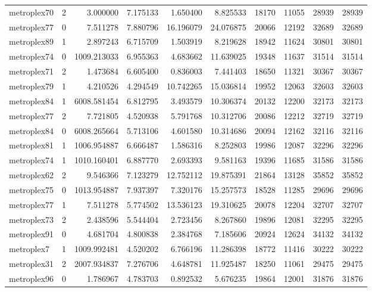 \begin{longtable}{|l|r|r|r|r|r|r|r|r|r|}
metroplex70 & 2 & 3.000000 & 7.175133 & 1.650400 & 8.825533 & 18170 & 11055 & 28939 & 28939 \\
metroplex77 & 0 & 7.511278 & 7.880796 & 16.196079 & 24.076875 & 20066 & 12192 & 32689 & 32689 \\
metroplex89 & 1 & 2.897243 & 6.715709 & 1.503919 & 8.219628 & 18942 & 11624 & 30801 & 30801 \\
metroplex74 & 0 & 1009.213033 & 6.955363 & 4.683662 & 11.639025 & 19348 & 11637 & 31514 & 31514 \\
metroplex71 & 2 & 1.473684 & 6.605400 & 0.836003 & 7.441403 & 18650 & 11321 & 30367 & 30367 \\
metroplex79 & 1 & 4.210526 & 4.294549 & 10.742265 & 15.036814 & 19952 & 12063 & 32603 & 32603 \\
metroplex84 & 1 & 6008.581454 & 6.812795 & 3.493579 & 10.306374 & 20132 & 12200 & 32173 & 32173 \\
metroplex77 & 2 & 7.721805 & 4.520938 & 5.791768 & 10.312706 & 20086 & 12212 & 32719 & 32719 \\
metroplex84 & 0 & 6008.265664 & 5.713106 & 4.601580 & 10.314686 & 20094 & 12162 & 32116 & 32116 \\
metroplex81 & 1 & 1006.954887 & 6.666487 & 1.586316 & 8.252803 & 19986 & 12087 & 32296 & 32296 \\
metroplex74 & 1 & 1010.160401 & 6.887770 & 2.693393 & 9.581163 & 19396 & 11685 & 31586 & 31586 \\
metroplex62 & 2 & 9.546366 & 7.123279 & 12.752112 & 19.875391 & 21864 & 13128 & 35852 & 35852 \\
metroplex75 & 0 & 1013.954887 & 7.937397 & 7.320176 & 15.257573 & 18528 & 11285 & 29696 & 29696 \\
metroplex77 & 1 & 7.511278 & 5.774502 & 13.536123 & 19.310625 & 20078 & 12204 & 32707 & 32707 \\
metroplex73 & 2 & 2.438596 & 5.544404 & 2.723456 & 8.267860 & 19896 & 12081 & 32295 & 32295 \\
metroplex91 & 0 & 4.681704 & 4.800838 & 2.384768 & 7.185606 & 20924 & 12624 & 34132 & 34132 \\
metroplex7 & 1 & 1009.992481 & 4.520202 & 6.766196 & 11.286398 & 18772 & 11416 & 30222 & 30222 \\
metroplex31 & 2 & 2007.934837 & 7.276706 & 4.648781 & 11.925487 & 18250 & 11061 & 29475 & 29475 \\
metroplex96 & 0 & 1.786967 & 4.783703 & 0.892532 & 5.676235 & 19864 & 12001 & 31876 & 31876 \\

\end{longtable}
